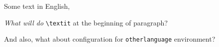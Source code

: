 \documentclass{article}
\begin{document}
\hypertarget{toc}{}
\tableofcontents


\blindtext

\label{sec:firstSection}

\blindtext

\blindenumerate

\label{ssec:firstSubSection}

\blindtext

\blinditemize

\blindtext

\blinddescription

 \label{sssec:example01}

\blindtext

\blindmathpaper

\begin{otherlanguage}{english}
    Some text in English, \hello
\end{otherlanguage}

\begin{otherlanguage}{english}

    \textit{What will do} \verb|\textit| at the beginning of paragraph?

    And also, what about configuration for \verb|otherlanguage| environment?

\end{otherlanguage}
\end{document}
